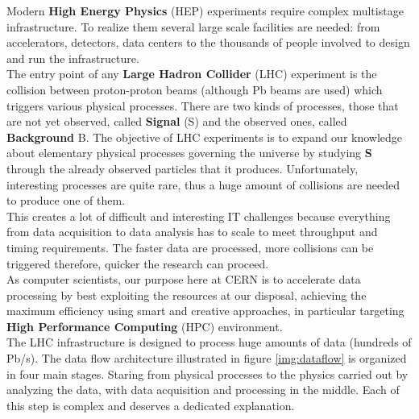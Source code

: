Modern \textbf{High Energy Physics} (HEP) experiments require complex multistage infrastructure. To realize them several large scale facilities are needed: from accelerators, detectors, data centers to the thousands of people involved to design and run the infrastructure.\\
The entry point of any \textbf{Large Hadron Collider} (LHC) experiment is the collision between proton-proton beams (although Pb beams are used) which triggers various physical processes. There are two kinds of processes, those that are not yet observed, called \textbf{Signal} (S) and the observed ones, called \textbf{Background} B. The objective of LHC experiments is to expand our knowledge about elementary physical processes governing the universe by studying \textbf{S} through the already observed particles that it produces. Unfortunately, interesting processes are quite rare, thus a huge amount of collisions are needed to produce one of them.\\
This creates a lot of difficult and interesting IT challenges because everything from data acquisition to data analysis has to scale to meet throughput and timing requirements. The faster data are processed, more collisions can be triggered therefore, quicker the research can proceed.\\
As computer scientists, our purpose here at CERN is to accelerate data processing by best exploiting the resources at our disposal, achieving the maximum efficiency using smart and creative approaches, in particular targeting \textbf{High Performance Computing} (HPC) environment. \\
The LHC infrastructure is designed to process huge amounts of data (hundreds of Pb/s). The data flow architecture illustrated in figure \ref{img:dataflow} is organized in four main stages. Staring from physical processes to the physics carried out by analyzing the data, with data acquisition and processing in the middle. Each of this step is complex and deserves a dedicated explanation. 
